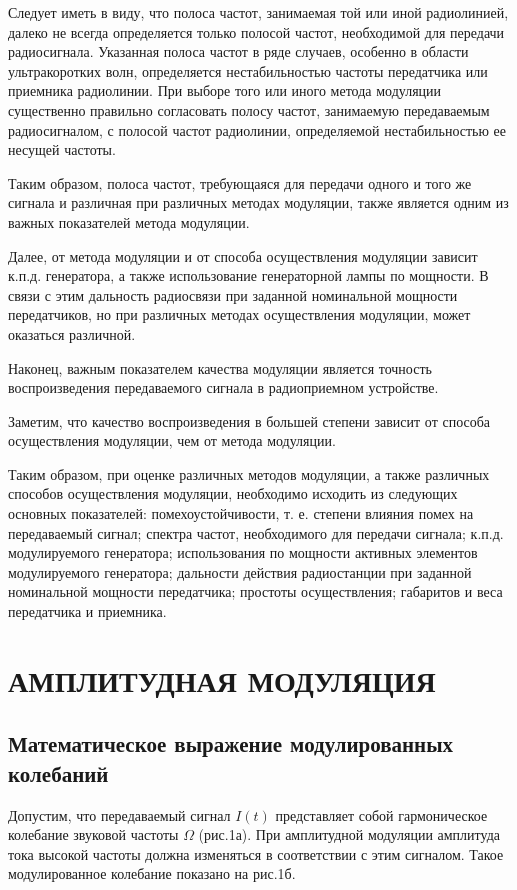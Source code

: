 Следует иметь в виду, что полоса частот, занимаемая той или иной радиолинией, далеко не всегда определяется только полосой частот, необходимой для передачи радиосигнала. Указанная полоса частот в ряде случаев, особенно в области ультракоротких волн, определяется нестабильностью частоты передатчика или приемника радиолинии. При выборе
того или иного метода модуляции существенно правильно согласовать полосу частот, занимаемую передаваемым радиосигналом, с полосой частот радиолинии, определяемой нестабильностью ее несущей частоты.

Таким образом, полоса частот, требующаяся для передачи одного и того же сигнала и различная при различных методах модуляции, также является одним из важных показателей метода модуляции.

Далее, от метода модуляции и от способа осуществления модуляции зависит к.п.д. генератора, а также использование генераторной лампы по мощности. В связи с этим дальность радиосвязи при заданной номинальной мощности передатчиков, но при различных методах осуществления модуляции, может оказаться различной.

Наконец, важным показателем качества модуляции является точность воспроизведения передаваемого сигнала в радиоприемном устройстве. 

Заметим, что качество воспроизведения в большей степени зависит от способа осуществления модуляции, чем от метода модуляции.

Таким образом, при оценке различных методов модуляции, а также различных способов осуществления модуляции, необходимо исходить из следующих основных показателей: помехоустойчивости, т. е. степени влияния помех на передаваемый сигнал; спектра частот, необходимого для передачи сигнала; к.п.д. модулируемого генератора; использования по мощности активных элементов модулируемого генератора; дальности действия радиостанции при заданной номинальной мощности передатчика; простоты
осуществления; габаритов и веса передатчика и приемника.

\section{АМПЛИТУДНАЯ МОДУЛЯЦИЯ}
\subsection{Математическое выражение модулированных колебаний}

Допустим, что передаваемый сигнал $I(t)$ представляет собой гармоническое колебание звуковой частоты $\Omega$ (рис.1а). При амплитудной модуляции амплитуда тока высокой частоты должна изменяться в соответствии с этим сигналом. Такое модулированное колебание показано на рис.1б.

